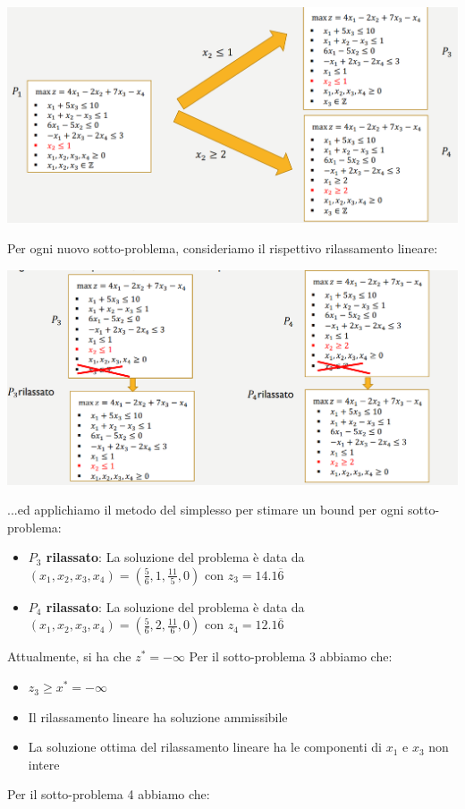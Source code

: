 \documentclass[12pt]{article}
\begin{document}
\begin{center}
    \includegraphics[width = 0.80\linewidth]{Images/77.png}
\end{center}
Per ogni nuovo sotto-problema, consideriamo il rispettivo rilassamento lineare:
\begin{center}
    \includegraphics[width = 0.80\linewidth]{Images/78.png}
\end{center}
...ed applichiamo il metodo del simplesso per stimare un bound per ogni sotto-problema:
\begin{itemize}
    \item \textbf{$P_3$ rilassato}: La soluzione del problema è data da $(x_1,x_2,x_3,x_4) = (\frac{5}{6}, 1, \frac{11}{5}, 0)$ con $z_3 = 14.1\overline{6}$
    \item \textbf{$P_4$ rilassato}: La soluzione del problema è data da $(x_1,x_2,x_3,x_4) = (\frac{5}{6}, 2, \frac{11}{6}, 0)$ con $z_4 = 12.1\overline{6}$
\end{itemize}
Attualmente, si ha che $z^* = -\infty$ \newline
Per il sotto-problema 3 abbiamo che:
\begin{itemize}
    \item $z_3 \geq x^* = -\infty$
    \item Il rilassamento lineare ha soluzione ammissibile
    \item La soluzione ottima del rilassamento lineare ha le componenti di $x_1$ e $x_3$ non intere
\end{itemize}
Per il sotto-problema 4 abbiamo che:
\end{document}
